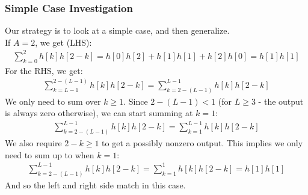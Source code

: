 \documentclass[a4paper]{article}
\begin{document}
\subsubsection*{Simple Case Investigation}
Our strategy is to look at a simple case, and then generalize. \\
If $A = 2$, we get (LHS):
\begin{align*}
\sum_{k=0}^{2}h[k]h[2-k] = h[0]h[2] + h[1]h[1] + h[2]h[0] = h[1]h[1]
\end{align*}
For the RHS, we get:
\begin{align*}
\sum_{k=L-1}^{2-(L-1)}h[k]h[2-k] = \sum_{k=2-(L-1)}^{L-1}h[k]h[2-k]
\end{align*}
We only need to sum over $k \geq 1$. Since $2-(L-1) < 1$ (for $L \geq 3$ - the output is always zero otherwise), we can start summing at $k = 1$:
\begin{align*}
\sum_{k=2-(L-1)}^{L-1}h[k]h[2-k] = \sum_{k=1}^{L-1}h[k]h[2-k]
\end{align*}
We also require $2-k \geq 1$ to get a possibly nonzero output. This implies we only need to sum up to when $k = 1$:
\begin{align*}
\sum_{k=2-(L-1)}^{L-1}h[k]h[2-k] = \sum_{k=1}^{1}h[k]h[2-k] = h[1]h[1]
\end{align*}
And so the left and right side match in this case.
\clearpage
\end{document}
